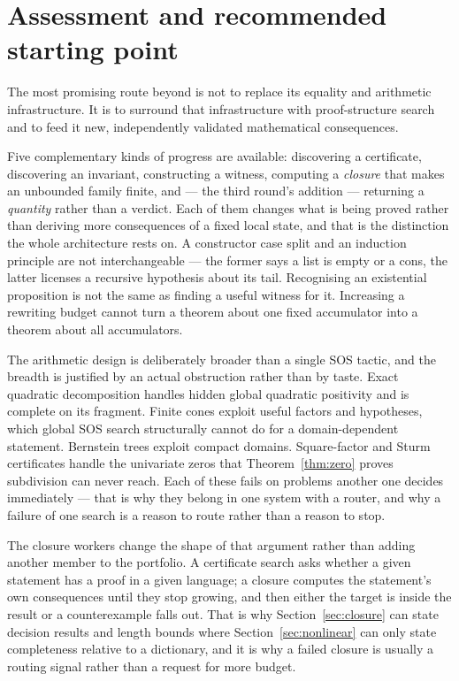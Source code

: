 \section{Assessment and recommended starting point}

The most promising route beyond \grind{} is not to replace its equality and
arithmetic infrastructure. It is to surround that infrastructure with
proof-structure search and to feed it new, independently validated mathematical
consequences.

Five complementary kinds of progress are available: discovering a certificate,
discovering an invariant, constructing a witness, computing a \emph{closure}
that makes an unbounded family finite, and --- the third round's addition ---
returning a \emph{quantity} rather than a verdict. Each of them changes what
is being proved rather than deriving more consequences of a fixed local state,
and that is the distinction the whole architecture rests on. A constructor case
split and an induction principle are not interchangeable --- the former says a
list is empty or a cons, the latter licenses a recursive hypothesis about its
tail. Recognising an existential proposition is not the same as finding a useful
witness for it. Increasing a rewriting budget cannot turn a theorem about one
fixed accumulator into a theorem about all accumulators.

The arithmetic design is deliberately broader than a single SOS tactic, and the
breadth is justified by an actual obstruction rather than by taste. Exact
quadratic decomposition handles hidden global quadratic positivity and is
complete on its fragment. Finite cones exploit useful factors and hypotheses,
which global SOS search structurally cannot do for a domain-dependent statement.
Bernstein trees exploit compact domains. Square-factor and Sturm certificates
handle the univariate zeros that Theorem~\ref{thm:zero} proves subdivision can
never reach. Each of these fails on problems another one decides immediately ---
that is why they belong in one system with a router, and why a failure of one
search is a reason to route rather than a reason to stop.

The closure workers change the shape of that argument rather than adding another
member to the portfolio. A certificate search asks whether a given statement has
a proof in a given language; a closure computes the statement's own consequences
until they stop growing, and then either the target is inside the result or a
counterexample falls out. That is why Section~\ref{sec:closure} can state
decision results and length bounds where Section~\ref{sec:nonlinear} can only
state completeness relative to a dictionary, and it is why a failed closure is
usually a routing signal rather than a request for more budget.

